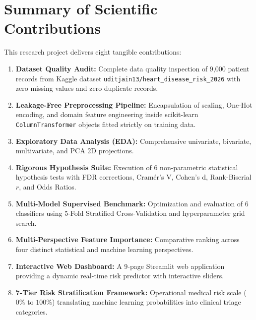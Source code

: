 \section{Summary of Scientific Contributions}
This research project delivers eight tangible contributions:
\begin{enumerate}
    \item \textbf{Dataset Quality Audit:} Complete data quality inspection of 9,000 patient records from Kaggle dataset \texttt{uditjain13/heart\_disease\_risk\_2026} with zero missing values and zero duplicate records.
    \item \textbf{Leakage-Free Preprocessing Pipeline:} Encapsulation of scaling, One-Hot encoding, and domain feature engineering inside scikit-learn \texttt{ColumnTransformer} objects fitted strictly on training data.
    \item \textbf{Exploratory Data Analysis (EDA):} Comprehensive univariate, bivariate, multivariate, and PCA 2D projections.
    \item \textbf{Rigorous Hypothesis Suite:} Execution of 6 non-parametric statistical hypothesis tests with FDR corrections, Cramér's V, Cohen's d, Rank-Biserial $r$, and Odds Ratios.
    \item \textbf{Multi-Model Supervised Benchmark:} Optimization and evaluation of 6 classifiers using 5-Fold Stratified Cross-Validation and hyperparameter grid search.
    \item \textbf{Multi-Perspective Feature Importance:} Comparative ranking across four distinct statistical and machine learning perspectives.
    \item \textbf{Interactive Web Dashboard:} A 9-page Streamlit web application providing a dynamic real-time risk predictor with interactive sliders.
    \item \textbf{7-Tier Risk Stratification Framework:} Operational medical risk scale ($0\%$ to $100\%$) translating machine learning probabilities into clinical triage categories.
\end{enumerate}
